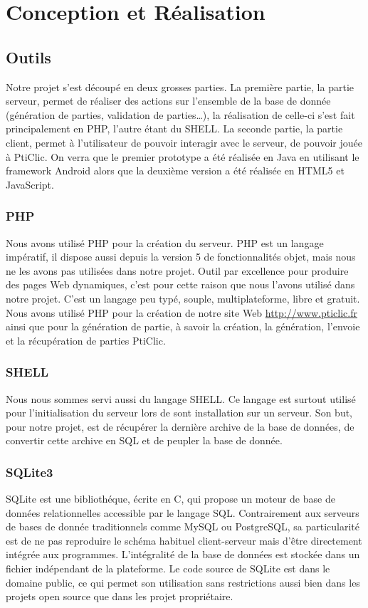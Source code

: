 \documentclass[a4paper,11pt,french]{article}
\def\android{Android\texttrademark{}}
\begin{document}
\pagebreak

\section{Conception et Réalisation}

\subsection{Outils}

Notre projet s'est découpé en deux grosses parties. La première partie, la \og{}partie serveur\fg{}, permet de réaliser des actions sur l'ensemble de la base de donnée (génération de parties, validation de parties\ldots),
la réalisation de celle-ci s'est fait principalement en PHP, l'autre étant du SHELL.
La seconde partie, la \og{}partie client\fg{}, permet à l'utilisateur de pouvoir interagir avec le serveur, de pouvoir jouée à PtiClic. On verra que le premier prototype a été réalisée en Java en utilisant le framework \android{} alors   que la deuxième version a été réalisée en HTML5 et JavaScript.

\subsubsection{PHP}
Nous avons utilisé PHP pour la création du serveur. PHP est un langage impératif, il dispose aussi depuis la version 5 de fonctionnalités objet, mais nous ne les avons pas utilisées dans notre projet. Outil par excellence pour produire des pages Web dynamiques, c'est pour cette raison que nous l'avons utilisé dans notre projet. C'est un langage peu typé, souple, multiplateforme, libre et gratuit.
Nous avons utilisé PHP pour la création de notre site Web \url{http://www.pticlic.fr} ainsi que pour la génération de partie, à savoir la création, la génération, l'envoie et la récupération de parties PtiClic.

\subsubsection{SHELL}
Nous nous sommes servi aussi du langage SHELL. Ce langage est surtout utilisé pour l'initialisation du serveur lors de sont installation sur un serveur. Son but, pour notre projet, est de récupérer la dernière archive de la base de données, de convertir cette archive en SQL et de peupler la base de donnée.

\subsubsection{SQLite3}
SQLite est une bibliothéque, écrite en C, qui propose un moteur de base de données relationnelles accessible par le langage SQL. Contrairement aux serveurs de bases de donnée traditionnels comme MySQL ou PostgreSQL, sa particularité est de ne pas reproduire le schéma habituel client-serveur mais d'être directement intégrée aux programmes. L'intégralité de la base de données est stockée dans un fichier indépendant de la plateforme. Le code source de SQLite est dans le domaine public, ce qui permet son utilisation sans restrictions aussi bien dans les projets open source que dans les projet propriétaire.
\end{document}
